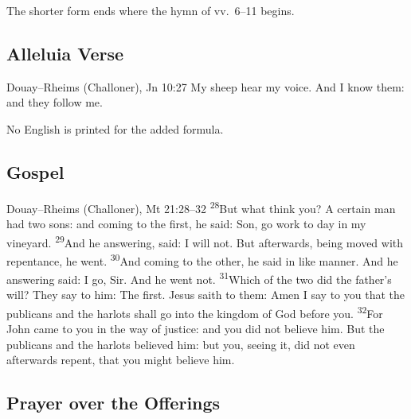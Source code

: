 \noindent The shorter form ends where the hymn of vv.~6--11 begins.

\subsection{Alleluia Verse}
\label{proper-gospel-acclamation}


\begin{englishwitness}{Douay--Rheims (Challoner), Jn 10:27}
My sheep hear my voice. And I know them: and they follow me.
\end{englishwitness}

\noindent No English is printed for the added formula.

\subsection{Gospel}
\label{proper-gospel}


\begin{englishwitness}{Douay--Rheims (Challoner), Mt 21:28--32}
\textsuperscript{28}But what think you? A certain man had two sons: and coming
to the first, he said: Son, go work to day in my vineyard.
\textsuperscript{29}And he answering, said: I will not. But afterwards, being
moved with repentance, he went. \textsuperscript{30}And coming to the other, he
said in like manner. And he answering said: I go, Sir. And he went not.
\textsuperscript{31}Which of the two did the father's will? They say to him:
The first. Jesus saith to them: Amen I say to you that the publicans and the
harlots shall go into the kingdom of God before you. \textsuperscript{32}For
John came to you in the way of justice: and you did not believe him. But the
publicans and the harlots believed him: but you, seeing it, did not even
afterwards repent, that you might believe him.
\end{englishwitness}

\subsection{Prayer over the Offerings}
\label{proper-prayer-over-offerings}

